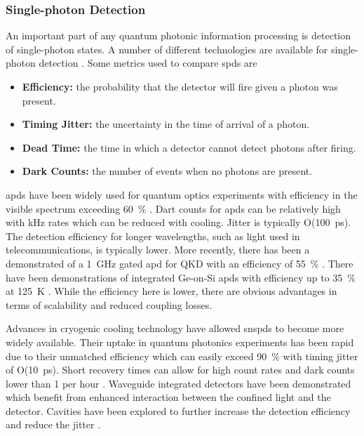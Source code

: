 \subsubsection*{Single-photon Detection}

An important part of any quantum photonic information processing is detection of single-photon states. A number of different technologies are available for single-photon detection \cite{hadfield2009single}. Some metrics used to compare \acp{spd} are

\begin{itemize}
	\item \textbf{Efficiency:} the probability that the detector will fire given a photon was present.
	\item \textbf{Timing Jitter:} the uncertainty in the time of arrival of a photon.
	\item \textbf{Dead Time:} the time in which a detector cannot detect photons after firing.
	\item \textbf{Dark Counts:} the number of events when no photons are present.
\end{itemize}

\Acp{apd} have been widely used for quantum optics experiments with efficiency in the visible spectrum exceeding \SI{60}{\percent} \cite{hadfield2009single}. Dart counts for \acp{apd} can be relatively high with \si{kHz} rates which can be reduced with cooling. Jitter is typically O(\SI{100}{ps}). The detection efficiency for longer wavelengths, such as light used in telecommunications, is typically lower. More recently, there has been a demonstrated of a \SI{1}{GHz} gated \ac{apd} for \ac{QKD} with an efficiency of \SI{55}{\percent} \cite{comandar2015gigahertz}. There have been demonstrations of integrated Ge-on-Si \acp{apd} with efficiency up to \SI{35}{\percent} at \SI{125}{\kelvin} \cite{Martinez2017Single, vines2019high}. While the efficiency here is lower, there are obvious advantages in terms of scalability and reduced coupling losses.


Advances in cryogenic cooling technology have allowed \acp{snspd} to become more widely available. Their uptake in quantum photonics experiments has been rapid due to their unmatched efficiency which can easily exceed \SI{90}{\percent} with timing jitter of O(\SI{10}{ps}). Short recovery times can allow for high count rates and dark counts lower than 1 per hour \cite{wollman2017}. Waveguide integrated detectors have been demonstrated \cite{sprengers2011} which benefit from enhanced interaction between the confined light and the detector. Cavities have been explored to further increase the detection efficiency and reduce the jitter \cite{vetter2016, yun2019, tyler2016modelling}.

